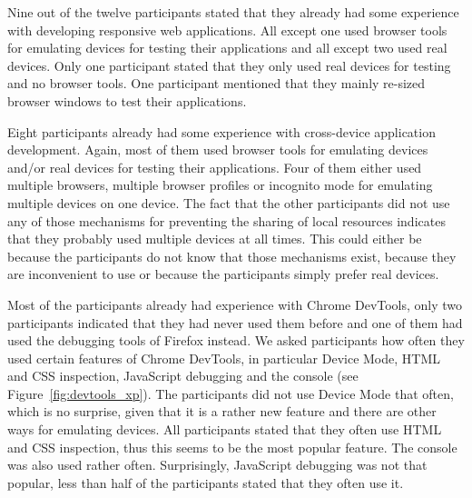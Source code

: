 Nine out of the twelve participants stated that they already had some experience with developing responsive web applications. All except one used browser tools for emulating devices for testing their applications and all except two used real devices. Only one participant stated that they only used real devices for testing and no browser tools. One participant mentioned that they mainly re-sized browser windows to test their applications.

Eight participants already had some experience with cross-device application development. Again, most of them used browser tools for emulating devices and/or real devices for testing their applications. Four of them either used multiple browsers, multiple browser profiles or incognito mode for emulating multiple devices on one device. The fact that the other participants did not use any of those mechanisms for preventing the sharing of local resources indicates that they probably used multiple devices at all times. This could either be because the participants do not know that those mechanisms exist, because they are inconvenient to use or because the participants simply prefer real devices.

Most of the participants already had experience with Chrome DevTools, only two participants indicated that they had never used them before and one of them had used the debugging tools of Firefox instead. We asked participants how often they used certain features of Chrome DevTools, in particular Device Mode, HTML and CSS inspection, JavaScript debugging and the console (see Figure~\ref{fig:devtools_xp}). The participants did not use Device Mode that often, which is no surprise, given that it is a rather new feature and there are other ways for emulating devices. All participants stated that they often use HTML and CSS inspection, thus this seems to be the most popular feature. The console was also used rather often. Surprisingly, JavaScript debugging was not that popular, less than half of the participants stated that they often use it.


